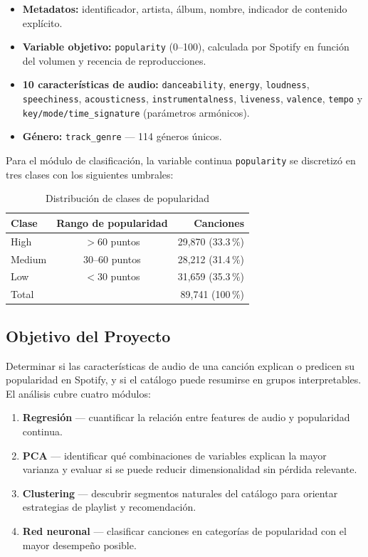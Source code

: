 \documentclass[12pt,a4paper]{article}
\begin{document}
\begin{itemize}[noitemsep]
  \item \textbf{Metadatos:} identificador, artista, \'album, nombre, indicador de contenido
    expl\'icito.
  \item \textbf{Variable objetivo:} \texttt{popularity} (0--100), calculada por Spotify en funci\'on
    del volumen y recencia de reproducciones.
  \item \textbf{10 caracter\'isticas de audio:} \texttt{danceability}, \texttt{energy},
    \texttt{loudness}, \texttt{speechiness}, \texttt{acousticness},
    \texttt{instrumentalness}, \texttt{liveness}, \texttt{valence}, \texttt{tempo} y
    \texttt{key/mode/time\_signature} (par\'ametros arm\'onicos).
  \item \textbf{G\'enero:} \texttt{track\_genre} --- 114 g\'eneros \'unicos.
\end{itemize}

Para el m\'odulo de clasificaci\'on, la variable continua \texttt{popularity} se
discretiz\'o en tres clases con los siguientes umbrales:

\begin{table}[H]
\centering
\caption{Distribuci\'on de clases de popularidad}
\begin{tabular}{lcr}
\toprule
\textbf{Clase} & \textbf{Rango de popularidad} & \textbf{Canciones} \\
\midrule
High   & $> 60$ puntos   & 29{,}870 (33.3\,\%) \\
Medium & 30--60 puntos   & 28{,}212 (31.4\,\%) \\
Low    & $< 30$ puntos   & 31{,}659 (35.3\,\%) \\
\midrule
Total  &                 & 89{,}741 (100\,\%)  \\
\bottomrule
\end{tabular}
\end{table}

\subsection{Objetivo del Proyecto}

Determinar si las caracter\'isticas de audio de una canci\'on explican o predicen su
popularidad en Spotify, y si el cat\'alogo puede resumirse en grupos interpretables.
El an\'alisis cubre cuatro m\'odulos:

\begin{enumerate}[noitemsep]
  \item \textbf{Regresi\'on} --- cuantificar la relaci\'on entre features de audio y
    popularidad continua.
  \item \textbf{PCA} --- identificar qu\'e combinaciones de variables explican la mayor
    varianza y evaluar si se puede reducir dimensionalidad sin p\'erdida relevante.
  \item \textbf{Clustering} --- descubrir segmentos naturales del cat\'alogo para orientar
    estrategias de playlist y recomendaci\'on.
  \item \textbf{Red neuronal} --- clasificar canciones en categor\'ias de popularidad con el
    mayor desempe\~no posible.
\end{enumerate}
\end{document}
